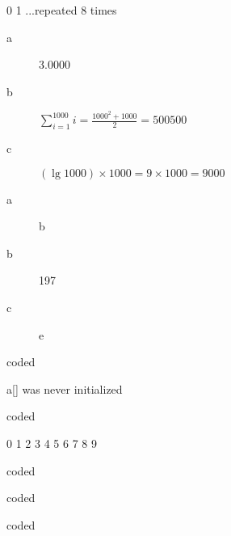 \documentclass[10pt,a4paper]{article}
\newenvironment{problem}[2][Problem]{\begin{trivlist}
	\item[\hskip \labelsep {\bfseries #1}\hskip \labelsep {\bfseries #2}]}{\end{trivlist}}
\begin{document}
\begin{problem}{1.1.6}
\end{problem}

0
1
...repeated 8 times

\begin{problem}{1.1.7}
\end{problem}

\begin{description}
  \item[a] 3.0000
  \item[b] \( \sum\limits_{i=1}^{1000} i = \frac{1000^2 + 1000}{2} = 500500 \)
  \item[c] \( (\lg 1000)  \times 1000 = 9 \times 1000 = 9000\)
\end{description}

\begin{problem}{1.1.8}
\end{problem}

\begin{description}
  \item[a] b
  \item[b] 197
  \item[c] e
\end{description}

\begin{problem}{1.1.9} coded
\end{problem}

\begin{problem}{1.1.10}
\end{problem}

a[] was never initialized

\begin{problem}{1.1.11} coded
\end{problem}

\begin{problem}{1.1.12}
\end{problem}

0 1 2 3 4 5 6 7 8 9

\begin{problem}{1.1.13} coded
\end{problem}

\begin{problem}{1.1.14} coded
\end{problem}

\begin{problem}{1.1.15} coded
\end{problem}

\begin{problem}{1.1.16 }
\end{problem}
\end{document}
